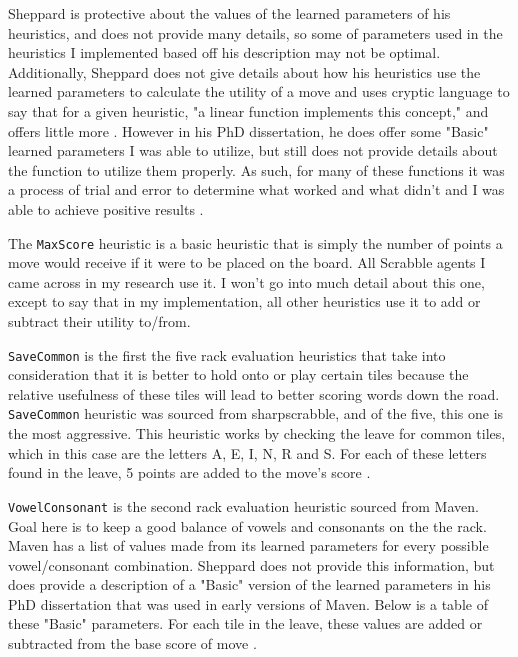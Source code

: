 \documentclass[letterpaper]{article}
\begin{document}
Sheppard is protective about the values of the learned parameters of his heuristics, and does not provide many details, so some of parameters used in the heuristics I implemented based off his description may not be optimal. Additionally, Sheppard does not give details about how his heuristics use the learned parameters to calculate the utility of a move and uses cryptic language to say that for a given heuristic, "a linear function implements this concept," and offers little more \cite{1sheppard2002}. However in his PhD dissertation, he does offer some "Basic" learned parameters I was able to utilize, but still does not provide details about the function to utilize them properly. As such, for many of these functions it was a process of trial and error to determine what worked and what didn't and I was able to achieve positive results \cite{2sheppard2002}.

The \texttt{MaxScore} heuristic is a basic heuristic that is simply the number of points a move would receive if it were to be placed on the board. All Scrabble agents I came across in my research use it. I won't go into much detail about this one, except to say that in my implementation, all other heuristics use it to add or subtract their utility to/from.

\texttt{SaveCommon} is the first the five rack evaluation heuristics that take into consideration that it is better to hold onto or play certain tiles because the relative usefulness of these tiles will lead to better scoring words down the road. \texttt{SaveCommon} heuristic was sourced from sharpscrabble, and of the five, this one is the most aggressive. This heuristic works by checking the leave for common tiles, which in this case are the letters A, E, I, N, R and S. For each of these letters found in the leave, 5 points are added to the move's score \cite{sharpscrabble}.

\texttt{VowelConsonant} is the second rack evaluation heuristic sourced from Maven. Goal here is to keep a good balance of vowels and consonants on the the rack. Maven has a list of values made from its learned parameters for every possible vowel/consonant combination. Sheppard does not provide this information, but does provide a description of a "Basic" version of the learned parameters in his PhD dissertation that was used in early versions of Maven. Below is a table of these "Basic" parameters. For each tile in the leave, these values are added or subtracted from the base score of move \cite{2sheppard2002}.
\end{document}
